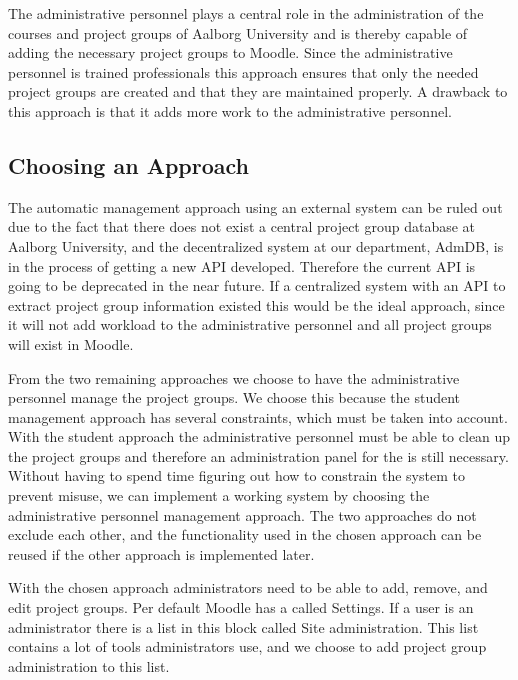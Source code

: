 The administrative personnel plays a central role in the administration of the courses and project groups of Aalborg University and is thereby capable of adding the necessary project groups to Moodle. 
Since the administrative personnel is trained professionals this approach ensures that only the needed project groups are created and that they are maintained properly. 
A drawback to this approach is that it adds more work to the administrative personnel.


\subsection{Choosing an Approach}
The automatic management approach using an external system can be ruled out due to the fact that there does not exist a central project group database at Aalborg University, and the decentralized system at our department, AdmDB, is in the process of getting a new API developed.
Therefore the current API is going to be deprecated in the near future. 
If a centralized system with an API to extract project group information existed this would be the ideal approach, since it will not add workload to the administrative personnel and all project groups will exist in Moodle. 

From the two remaining approaches we choose to have the administrative personnel manage the project groups. 
We choose this because the student management approach has several constraints, which must be taken into account. 
With the student approach the administrative personnel must be able to clean up the project groups and therefore an administration panel for the \admpers{} is still necessary.
Without having to spend time figuring out how to constrain the system to prevent misuse, we can implement a working system by choosing the administrative personnel management approach.
The two approaches do not exclude each other, and the functionality used in the chosen approach can be reused if the other approach is implemented later.

With the chosen approach administrators need to be able to add, remove, and edit project groups.
Per default Moodle has a \block{} called Settings. 
If a user is an administrator there is a list in this block called Site administration. 
This list contains a lot of tools administrators use, and we choose to add project group administration to this list. 


